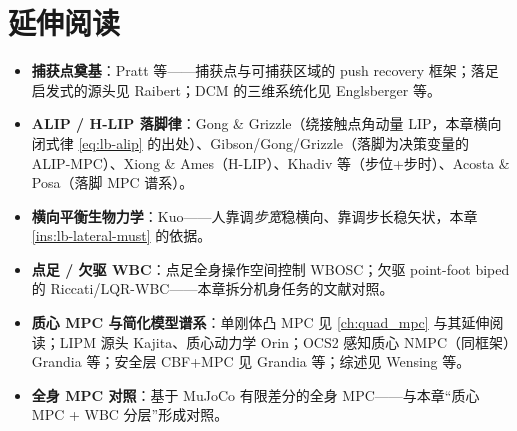 \section*{延伸阅读}
\begin{itemize}
  \item \textbf{捕获点奠基}：Pratt 等\cite{pratt2006capture}——捕获点与可捕获区域的 push recovery 框架；落足启发式的源头见 Raibert\cite{raibert1986legged}；DCM 的三维系统化见 Englsberger 等\cite{englsberger2015dcm}。
  \item \textbf{ALIP / H-LIP 落脚律}：Gong \& Grizzle\cite{gong2022alip}（绕接触点角动量 LIP，本章横向闭式律 \cref{eq:lb-alip} 的出处）、Gibson/Gong/Grizzle\cite{gibson2022alipmpc}（落脚为决策变量的 ALIP-MPC）、Xiong \& Ames\cite{xiong2022hlip}（H-LIP）、Khadiv 等\cite{khadiv2016stepping}（步位+步时）、Acosta \& Posa\cite{acosta2023mpfc}（落脚 MPC 谱系）。
  \item \textbf{横向平衡生物力学}：Kuo\cite{kuo1999stabilization}——人靠调\emph{步宽}稳横向、靠调步长稳矢状，本章 \cref{ins:lb-lateral-must} 的依据。
  \item \textbf{点足 / 欠驱 WBC}：点足全身操作空间控制 WBOSC\cite{wbosc2015}；欠驱 point-foot biped 的 Riccati/LQR-WBC\cite{dai2024pointfoot}——本章拆分机身任务的文献对照。
  \item \textbf{质心 MPC 与简化模型谱系}：单刚体凸 MPC 见 \cref{ch:quad_mpc} 与其延伸阅读；LIPM 源头 Kajita\cite{kajita2001lipm}、质心动力学 Orin\cite{orin2013centroidal}；OCS2 感知质心 NMPC（同框架）Grandia 等\cite{grandia2022perceptive}；安全层 CBF+MPC 见 Grandia 等\cite{grandia2021cbf}；综述见 Wensing 等\cite{wensing2024legged}。
  \item \textbf{全身 MPC 对照}：基于 MuJoCo 有限差分的全身 MPC\cite{howell2023wholebodympc}——与本章“质心 MPC + WBC 分层”形成对照。
\end{itemize}

